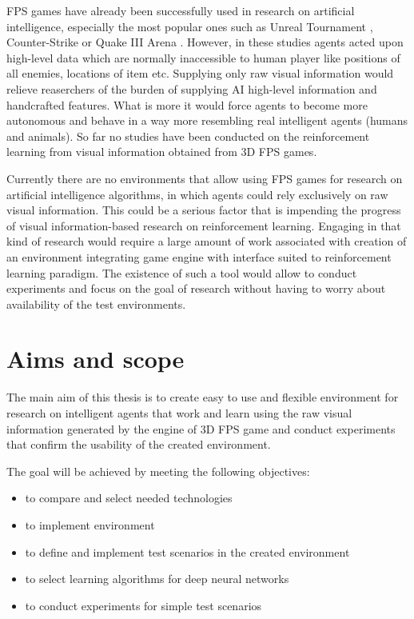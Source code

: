 FPS games have already been successfully used in research on artificial intelligence, especially the most popular ones such as Unreal Tournament \cite{6314567} \cite{6922494}, Counter-Strike \cite{5035619} or Quake III Arena \cite{el2007hybrid}.
However, in these studies agents acted upon high-level data which are normally inaccessible to human player like positions of all enemies, locations of item etc.
Supplying only raw visual information would relieve reaserchers of the burden of supplying AI high-level information and handcrafted features.
What is more it would force agents to become more autonomous and behave in a way more resembling real intelligent agents (humans and animals).
So far no studies have been conducted on the reinforcement learning from visual information obtained from 3D FPS games.


Currently there are no environments that allow using FPS games for research on artificial intelligence algorithms, in which agents could rely exclusively on raw visual information.
This could be a serious factor that is impending the progress of visual information-based research on reinforcement learning.
Engaging in that kind of research would require a large amount of work associated with creation of an environment integrating game engine with interface suited to reinforcement learning paradigm.
The existence of such a tool would allow to conduct experiments and focus on the goal of research without having to worry about availability of the test environments.
 

\section{Aims and scope}


The main aim of this thesis is to create easy to use and flexible environment for research on intelligent agents that work and learn using the raw visual information generated by the engine of 3D FPS game and conduct experiments that confirm the usability of the created environment.

The goal will be achieved by meeting the following objectives:
\begin{itemize}
 \item to compare and select needed technologies
 \item to implement environment
 \item to define and implement test scenarios in the created environment
 \item to select learning algorithms for deep neural networks
 \item to conduct experiments for simple test scenarios
\end{itemize}


